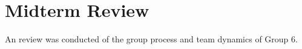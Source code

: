 \chapter{Midterm Review}\label{midterm review}\label{section \thechapter}
An review was conducted of the group process and team dynamics of Group 6.


